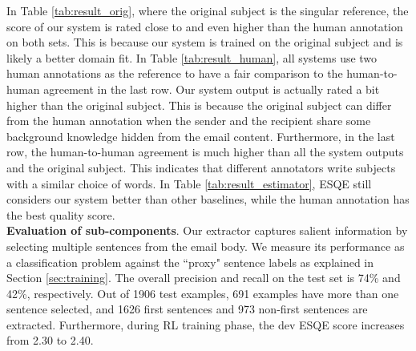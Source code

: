 \documentclass[11pt,a4paper]{article}
\newcommand{\esqe}{{\sc ESQE}\xspace}
\begin{document}
In Table \ref{tab:result_orig}, where the original subject is the singular reference, the score of our system is rated close to and even higher than the human annotation on both sets.
This is because our system is trained on the original subject and is likely a better domain fit.
In Table \ref{tab:result_human}, all systems use two human annotations as the reference to have a fair comparison to the human-to-human agreement in the last row.
Our system output is actually rated a bit higher than the original subject.
This is because the original subject can differ from the human annotation when the sender and the recipient share some background knowledge hidden from the email content.
Furthermore, in the last row, the human-to-human agreement is much higher than all the system outputs and the original subject.
This indicates that different annotators write subjects with a similar choice of words.
In Table \ref{tab:result_estimator}, \esqe still considers our system better than other baselines, while the human annotation has the best quality score.\\
\textbf{Evaluation of sub-components}.
Our extractor captures salient information by selecting multiple sentences from the email body.
We measure its performance as a classification problem against the ``proxy" sentence labels as explained in Section \ref{sec:training}.
The overall precision and recall on the test set is 74\% and 42\%, respectively.
Out of 1906 test examples, 691 examples have more than one sentence selected, and 1626 first sentences and 973 non-first sentences are extracted.
Furthermore, during RL training phase, the dev \esqe score increases from 2.30 to 2.40.

\begin{table}[t!]
\centering
{}
\caption{\esqe score. Compared with our system, all other are statistically significant with  under a paired t-test.}
\label{tab:result_estimator}
\end{table}
\end{document}
